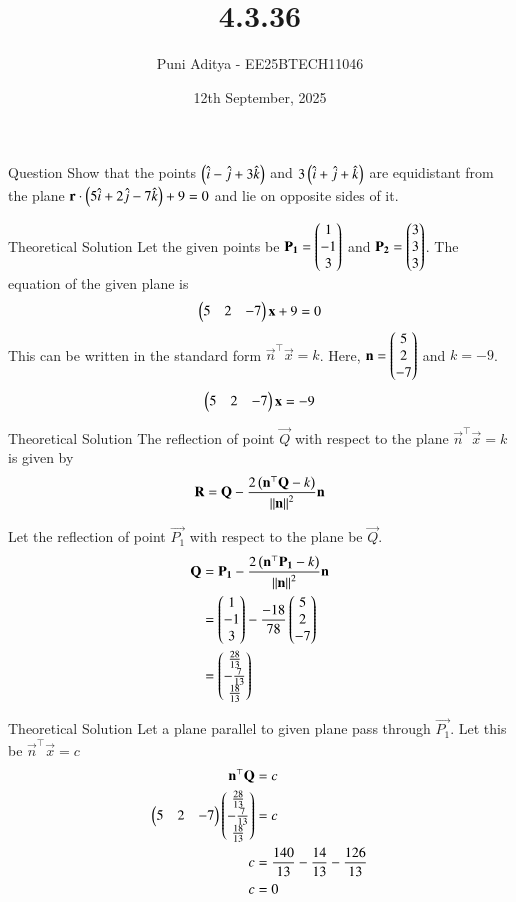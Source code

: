 \documentclass{beamer}
\title{4.3.36}
\date{12th September, 2025}
\author{Puni Aditya - EE25BTECH11046}
\begin{document}
\frame{\titlepage}
\begin{frame}{Question}
Show that the points $\left(\hat{i}-\hat{j}+3\hat{k}\right)$ and $3\left(\hat{i}+\hat{j}+\hat{k}\right)$ are equidistant from the plane $\mathbf{r}\cdot\left(5\hat{i}+2\hat{j}-7\hat{k}\right) + 9 = 0$ and lie on opposite sides of it.
\end{frame}

\begin{frame}{Theoretical Solution}
Let the given points be $\mathbf{P_1} = \begin{pmatrix}1 \\ -1 \\ 3\end{pmatrix}$ and $\mathbf{P_2} = \begin{pmatrix}3 \\ 3 \\ 3\end{pmatrix}$.
The equation of the given plane is
\begin{align}
    \begin{pmatrix}5 & 2 & -7\end{pmatrix}\mathbf{x} + 9 = 0
\end{align}
This can be written in the standard form $\vec{n}^\top\vec{x} = k$. Here, $\mathbf{n} = \begin{pmatrix}5 \\ 2 \\ -7\end{pmatrix}$ and $k = -9$.
\begin{align}
    \begin{pmatrix}5 & 2 & -7\end{pmatrix}\mathbf{x} = -9 \label{eq:plane_eqn}
\end{align}
\end{frame}

\begin{frame}{Theoretical Solution}
The reflection of point $\vec{Q}$ with respect to the plane $\vec{n}^\top\vec{x}=k$ is given by
\begin{align}
    \mathbf{R} = \mathbf{Q} - \frac{2\left(\mathbf{n}^\top\mathbf{Q}-k\right)}{\left\lVert\mathbf{n}\right\rVert^2}\mathbf{n}
\end{align}

Let the reflection of point $\vec{P_1}$ with respect to the plane be $\vec{Q}$.
\begin{align}
    \mathbf{Q} &= \mathbf{P_1} - \frac{2\left(\mathbf{n}^\top\mathbf{P_1}-k\right)}{\left\lVert\mathbf{n}\right\rVert^2}\mathbf{n} \\
    &= \begin{pmatrix}1 \\ -1 \\ 3\end{pmatrix} - \frac{-18}{78}\begin{pmatrix}5 \\ 2 \\ -7\end{pmatrix} \\
    &= \begin{pmatrix}\frac{28}{13} \\ -\frac{7}{13} \\ \frac{18}{13}\end{pmatrix}
\end{align}
\end{frame}

\begin{frame}{Theoretical Solution}
Let a plane parallel to given plane pass through $\vec{P_1}$. Let this be $\vec{n}^\top\vec{x}=c$
\begin{align}
    \mathbf{n}^\top\mathbf{Q} &= c \\
    \begin{pmatrix}5 & 2 & -7\end{pmatrix}\begin{pmatrix}\frac{28}{13} \\ -\frac{7}{13} \\ \frac{18}{13}\end{pmatrix} &= c \\
    c &= \frac{140}{13}-\frac{14}{13}-\frac{126}{13} \\
    c &= 0
\end{align}
\end{frame}
\end{document}
